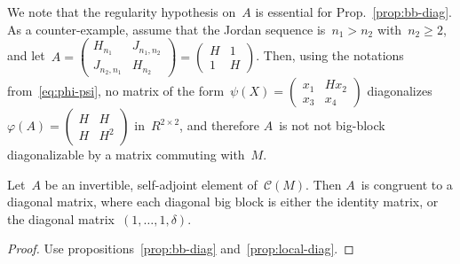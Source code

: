 \documentclass{lms}%
\let\ro\mathscr
\def\mat#1{\begin{pmatrix}#1\end{pmatrix}}
\begin{document}
We note that the regularity hypothesis on~$A$ is essential for
Prop.~\ref{prop:bb-diag}. As a counter-example, assume that the Jordan
sequence is~$n_1 > n_2$ with~$n_2 ≥ 2$, and let~$A = \mat{H_{n_1} &
J_{n_1,n_2} \\ J_{n_2,n_1} & H_{n_2}} = \mat{H&1\\1&H}$.
Then, using the notations from~\eqref{eq:phi-psi}, no matrix of the
form~$ψ(X) = \mat{x_1&H x_2\\x_3&x_4}$ diagonalizes~$φ(A) =
\mat{H&H\\H&H^2}$ in~$R^{2×2}$, and therefore $A$~is not not big-block
diagonalizable by a matrix commuting with~$M$.
\begin{prop}\label{prop:diag}%
Let~$A$ be an invertible, self-adjoint element of~$\ro C(M)$. Then $A$~is
congruent to a diagonal matrix, where each diagonal big block is either
the identity matrix, or the diagonal matrix~$(1, …, 1, δ)$.
\end{prop}

\begin{proof}
Use propositions~\ref{prop:bb-diag} and~\ref{prop:local-diag}.
\end{proof}%
\end{document}
